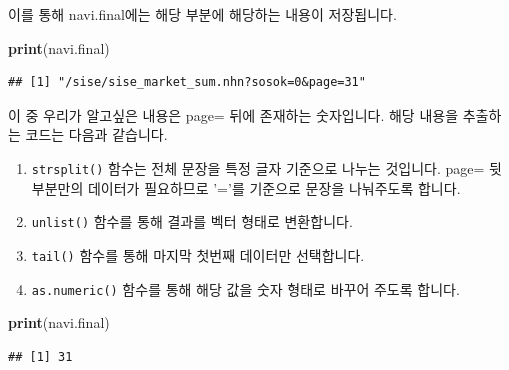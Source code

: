 \documentclass[]{book}
\newenvironment{Shaded}{\begin{snugshade}}{\end{snugshade}}
\newcommand{\DecValTok}[1]{\textcolor[rgb]{0.00,0.00,0.81}{#1}}
\newcommand{\KeywordTok}[1]{\textcolor[rgb]{0.13,0.29,0.53}{\textbf{#1}}}
\newcommand{\NormalTok}[1]{#1}
\newcommand{\OperatorTok}[1]{\textcolor[rgb]{0.81,0.36,0.00}{\textbf{#1}}}
\newcommand{\StringTok}[1]{\textcolor[rgb]{0.31,0.60,0.02}{#1}}
\providecommand{\tightlist}{%
  \setlength{\itemsep}{0pt}\setlength{\parskip}{0pt}}
\begin{document}
이를 통해 navi.final에는 해당 부분에 해당하는 내용이 저장됩니다.

\begin{Shaded}
\begin{Highlighting}[]
\KeywordTok{print}\NormalTok{(navi.final)}
\end{Highlighting}
\end{Shaded}

\begin{verbatim}
## [1] "/sise/sise_market_sum.nhn?sosok=0&page=31"
\end{verbatim}

이 중 우리가 알고싶은 내용은 page= 뒤에 존재하는 숫자입니다. 해당 내용을 추출하는 코드는 다음과 같습니다.

\begin{Shaded}
\end{Shaded}

\begin{enumerate}
\def\labelenumi{\arabic{enumi}.}
\tightlist
\item
  \texttt{strsplit()} 함수는 전체 문장을 특정 글자 기준으로 나누는 것입니다. page= 뒷부분만의 데이터가 필요하므로 '='를 기준으로 문장을 나눠주도록 합니다.
\item
  \texttt{unlist()} 함수를 통해 결과를 벡터 형태로 변환합니다.
\item
  \texttt{tail()} 함수를 통해 마지막 첫번째 데이터만 선택합니다.
\item
  \texttt{as.numeric()} 함수를 통해 해당 값을 숫자 형태로 바꾸어 주도록 합니다.
\end{enumerate}

\begin{Shaded}
\begin{Highlighting}[]
\KeywordTok{print}\NormalTok{(navi.final)}
\end{Highlighting}
\end{Shaded}

\begin{verbatim}
## [1] 31
\end{verbatim}
\end{document}
